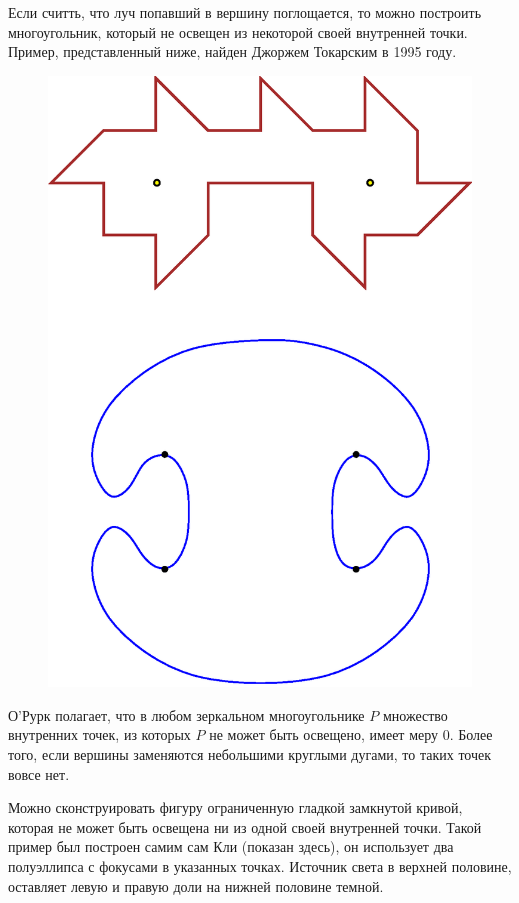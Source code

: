 Если считть, что луч попавший в вершину поглощается, то можно построить многоугольник, который не освещен из некоторой своей внутренней точки.
Пример, представленный ниже, найден Джоржем Токарским в 1995 году.

\begin{figure}[h!]
\centering
\includegraphics[scale=0.5]{Figs/UnsolvedPuzzles/vision}
\end{figure} %

О’Рурк полагает, что в любом зеркальном многоугольнике $P$ множество внутренних точек, из которых $P$ не может быть освещено, имеет меру 0.
Более того, если вершины заменяются небольшими круглыми дугами, то таких точек вовсе нет.

Можно сконструировать фигуру ограниченную гладкой замкнутой кривой, которая не может быть освещена ни из одной своей внутренней точки. 
Такой пример был построен самим сам Кли (показан здесь), он использует два полуэллипса с фокусами в указанных точках.
Источник света в верхней половине, оставляет левую и правую доли на нижней половине темной.

